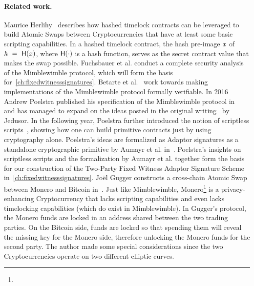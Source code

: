 \paragraph{Related work.} Maurice Herlihy~\cite{herlihy2018atomic} describes how hashed timelock contracts can be leveraged to build Atomic Swaps between Cryptocurrencies that have at least some basic scripting capabilities.
In a hashed timelock contract, the hash pre-image $\mathit{x}$ of $\mathit{h} ~=~ \mathsf{H} (\mathit{x})$, where $\mathsf{H} (\cdot)$ is a hash function, serves as the secret contract value that makes the swap possible.
Fuchsbauer et al. conduct a complete security analysis of the Mimblewimble protocol, which will form the basis for~\cref{ch:fixedwitnesssignatures}.
Betarte et al.~\cite{betarte2019towards} work towards making implementations of the Mimblewimble protocol formally verifiable.
In 2016 Andrew Poelstra published his specification of the Mimblewimble protocol in~\cite{poelstra2016mimblewimble} and has managed to expand on the ideas posted in the original writing~\cite{jedusor2016mimblewimble} by Jedusor.
In the following year, Poelstra further introduced the notion of scriptless scripts~\cite{poelstra2017scriptless}, showing how one can build primitive contracts just by using cryptography alone.
Poelstra's ideas are formalized as Adaptor signatures as a standalone cryptographic primitive by Aumayr et al. in~\cite{aumayr2020bitcoinchannels}.
Poelstra's insights on scriptless scripts and the formalization by Aumayr et al. together form the basis for our construction of the Two-Party Fixed Witness Adaptor Signature Scheme in~\cref{ch:fixedwitnesssignatures}.
Joël Gugger constructs a cross-chain Atomic Swap between Monero and Bitcoin in~\cite{gugger2020bitcoin}.
Just like Mimblewimble, Monero\footnote{\urlmonero} is a privacy-enhancing Cryptocurrency that lacks scripting capabilities and even lacks timelocking capabilities (which do exist in Mimblewimble).
In Gugger's protocol, the Monero funds are locked in an address shared between the two trading parties.
On the Bitcoin side, funds are locked so that spending them will reveal the missing key for the Monero side, therefore unlocking the Monero funds for the second party.
The author made some special considerations since the two Cryptocurrencies operate on two different elliptic curves.